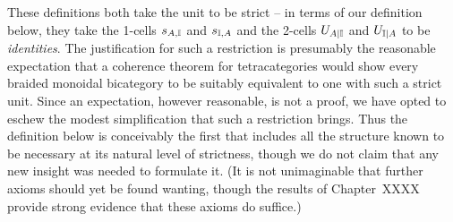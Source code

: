 \documentclass{robinthesisdraft}
\begin{document}
These definitions both take the unit to be strict -- in terms of
our definition below, they take the 1-cells $s_{A,{\mathbb{I}}}$ and $s_{{\mathbb{I}},A}$
and the 2-cells $U_{A|{\mathbb{I}}}$ and $U_{{\mathbb{I}}|A}$ to be \emph{identities}.
The justification for such a restriction is presumably the reasonable
expectation that a coherence theorem for tetracategories would
show every braided monoidal bicategory to be suitably equivalent
to one with such a strict unit. Since an expectation, however
reasonable, is not a proof, we have opted to eschew the modest
simplification that such a restriction brings.
%
Thus the definition below is conceivably the first that
includes all the structure known to be necessary at its natural level
of strictness, though we do not claim that any new insight was needed
to formulate it. (It is not unimaginable that further axioms should yet
be found wanting, though the results of Chapter~XXXX provide strong
evidence that these axioms do suffice.)
%
\end{document}
